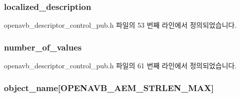 \subsubsection[{\texorpdfstring{localized\+\_\+description}{localized_description}}]{ localized\+\_\+description}\hypertarget{structopenavb__aem__descriptor__control__t_afd613361c59409fb6dcc0c237d1cfbfd}{}\label{structopenavb__aem__descriptor__control__t_afd613361c59409fb6dcc0c237d1cfbfd}


openavb\+\_\+descriptor\+\_\+control\+\_\+pub.\+h 파일의 53 번째 라인에서 정의되었습니다.

\subsubsection[{\texorpdfstring{number\+\_\+of\+\_\+values}{number_of_values}}]{ number\+\_\+of\+\_\+values}\hypertarget{structopenavb__aem__descriptor__control__t_a90bbd0467ca7ca1836b356ab4d67d8f2}{}\label{structopenavb__aem__descriptor__control__t_a90bbd0467ca7ca1836b356ab4d67d8f2}


openavb\+\_\+descriptor\+\_\+control\+\_\+pub.\+h 파일의 61 번째 라인에서 정의되었습니다.

\subsubsection[{\texorpdfstring{object\+\_\+name}{object_name}}]{ object\+\_\+name\mbox{[}{\bf O\+P\+E\+N\+A\+V\+B\+\_\+\+A\+E\+M\+\_\+\+S\+T\+R\+L\+E\+N\+\_\+\+M\+AX}\mbox{]}}\hypertarget{structopenavb__aem__descriptor__control__t_a5e98aba8105a7a6d82fac41816c83da3}{}\label{structopenavb__aem__descriptor__control__t_a5e98aba8105a7a6d82fac41816c83da3}


